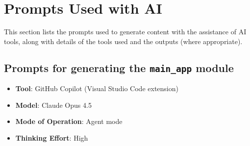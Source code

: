 \documentclass[a4paper,10pt]{amsart}
\begin{document}
\appendix \clearpage

\section{Prompts Used with AI} \label{adx:ai-prompts}

This section lists the prompts used to generate content with the assistance of AI tools, along with details of the tools used and the outputs (where appropriate).

\subsection{Prompts for generating the \texttt{main\_app} module} \label{adx:main-app-prompts}

\begin{itemize}
    \item \textbf{Tool}: GitHub Copilot (Visual Studio Code extension)
    \item \textbf{Model}: Claude Opus 4.5
    \item \textbf{Mode of Operation}: Agent mode
    \item \textbf{Thinking Effort}: High
\end{itemize}
\end{document}
